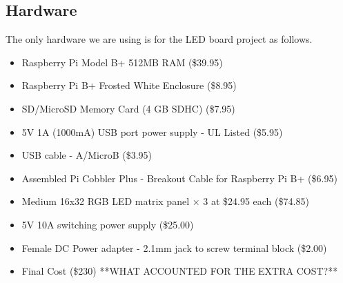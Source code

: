 \documentclass[12pt]{article}
\begin{document}
\subsection{Hardware}
The only hardware we are using is for the LED board project as follows.
\begin{itemize}
\item Raspberry Pi Model B+ 512MB RAM (\$39.95)
\item Raspberry Pi B+ Frosted White Enclosure (\$8.95)
\item SD/MicroSD Memory Card (4 GB SDHC) (\$7.95)
\item 5V 1A (1000mA) USB port power supply - UL Listed (\$5.95)
\item USB cable - A/MicroB (\$3.95)
\item Assembled Pi Cobbler Plus - Breakout Cable for Raspberry Pi B+ (\$6.95)
\item Medium 16x32 RGB LED matrix panel × 3 at \$24.95 each (\$74.85)
\item 5V 10A switching power supply (\$25.00)
\item Female DC Power adapter - 2.1mm jack to screw terminal block (\$2.00)
\item Final Cost (\$230) **WHAT ACCOUNTED FOR THE EXTRA COST?**
\end{itemize}
\end{document}
